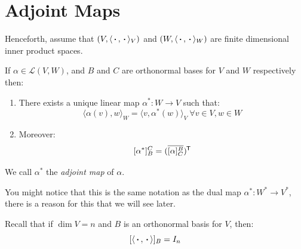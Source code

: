 \documentclass[../main.tex]{subfiles}
\begin{document}
\section{Adjoint Maps}
\begin{remark}[Note]
  Henceforth, assume that $(V, \langle {\hspace{0.18em}\boldsymbol{\cdot}\hspace{0.18em}}, {\hspace{0.18em}\boldsymbol{\cdot}\hspace{0.18em}} \rangle_{V})$ and $(W, \langle {\hspace{0.18em}\boldsymbol{\cdot}\hspace{0.18em}}, {\hspace{0.18em}\boldsymbol{\cdot}\hspace{0.18em}} \rangle_{W})$ are finite dimensional inner product spaces.
\end{remark}
\begin{theorem}
  If $\alpha \in \mathcal{L}(V, W)$, and $B$ and $C$ are orthonormal bases for $V$ and $W$ respectively then: \label{adjUnique}
  \begin{enumerate}
    \item There exists a unique linear map $\alpha^{*} : W \to V$ such that:
      \begin{equation}
        \langle \alpha(v), w \rangle_{W} = \langle v, \alpha^{*}(w) \rangle_{V}\ \forall v \in V, w \in W \label{adjProp}
      \end{equation}
    \item Moreover:
      \[
        [\alpha^{*}]^{C}_{B} = (\overline{[\alpha]^{B}_{C}})^{{\mkern-1.5mu\mathsf{T}}}
      \]
  \end{enumerate}
\end{theorem}
\begin{definition}
  We call $\alpha^{*}$ the \textit{adjoint map} of $\alpha$.
\end{definition}
\begin{remark}[Warning]
  You might notice that this is the same notation as the dual map $\alpha^{*}: W^{*} \to V^{*}$, there is a reason for this that we will see later.
\end{remark}
\begin{remark}[Recap]
  Recall that if $\dim V = n$ and $B$ is an orthonormal basis for $V$, then:
  \[
    [\langle {\hspace{0.18em}\boldsymbol{\cdot}\hspace{0.18em}}, {\hspace{0.18em}\boldsymbol{\cdot}\hspace{0.18em}} \rangle]_{B} = I_n
  \]
\end{remark}
\end{document}
